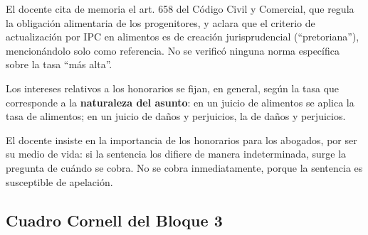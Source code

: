 \documentclass[12pt,oneside]{book}
\begin{document}
\begin{note}
El docente cita de memoria el art. 658 del C\'odigo Civil y Comercial, que regula la obligaci\'on alimentaria de los progenitores, y aclara que el criterio de actualizaci\'on por IPC en alimentos es de creaci\'on jurisprudencial (``pretoriana''), mencion\'andolo solo como referencia. No se verific\'o ninguna norma espec\'ifica sobre la tasa ``m\'as alta''.
\end{note}

\begin{important}
Los intereses relativos a los honorarios se fijan, en general, seg\'un la tasa que corresponde a la \textbf{naturaleza del asunto}: en un juicio de alimentos se aplica la tasa de alimentos; en un juicio de da\~nos y perjuicios, la de da\~nos y perjuicios.
\end{important}

El docente insiste en la importancia de los honorarios para los abogados, por ser su medio de vida: si la sentencia los difiere de manera indeterminada, surge la pregunta de cu\'ando se cobra. No se cobra inmediatamente, porque la sentencia es susceptible de apelaci\'on.

\subsection*{Cuadro Cornell del Bloque 3}
\end{document}
